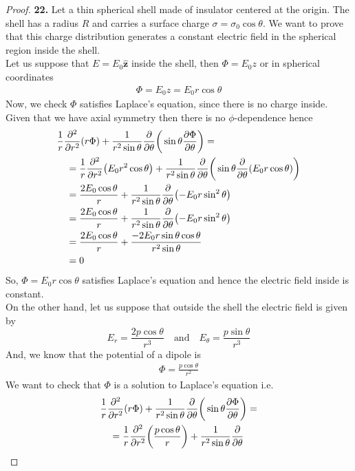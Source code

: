 \documentclass[11pt]{article}
\newcommand{\hatz}{\bm{\hat{z}}}
\theoremstyle{definition}
\begin{document}
\cleardoublepage
\begin{proof}{\textbf{22.}}
Let a thin spherical shell made of insulator centered at the origin. The shell
has a radius $R$ and carries a surface charge $\sigma = \sigma_0\cos\theta$.
We want to prove that this charge distribution generates a constant electric
field in the spherical region inside the shell.
\\
Let us suppose that $E = E_0 \hatz$ inside the shell, then $\Phi = E_0 z$
or in spherical coordinates
\begin{align*}
    \Phi = E_0 z = E_0 r\cos\theta
\end{align*}
Now, we check $\Phi$ satisfies Laplace's equation, since there is no charge
inside. Given that we have axial symmetry then there is no
$\phi$-dependence hence
\begin{align*}
    &\frac{1}{r}\pdv[2]{r}(r\Phi)
    + \frac{1}{r^2\sin\theta}\pdv{\theta}\bigg(\sin\theta\pdv{\Phi}{\theta}\bigg) =\\
    &\quad= \frac{1}{r}\pdv[2]{r}(E_0 r^2\cos\theta)
    + \frac{1}{r^2\sin\theta}\pdv{\theta}\bigg(\sin\theta\pdv{\theta}(E_0 r\cos\theta)
    \bigg)\\
    &\quad= \frac{2E_0\cos\theta}{r}
    + \frac{1}{r^2\sin\theta}\pdv{\theta}(-E_0 r\sin^2\theta)\\
    &\quad= \frac{2E_0\cos\theta}{r}
    + \frac{1}{r^2\sin\theta}\pdv{\theta}(-E_0 r\sin^2\theta)\\
    &\quad= \frac{2E_0\cos\theta}{r}
    + \frac{-2E_0 r\sin\theta\cos\theta}{r^2\sin\theta}\\
    &\quad= 0
\end{align*}
So, $\Phi = E_0 r \cos\theta$ satisfies Laplace's equation and hence the electric
field inside is constant.
\\
On the other hand, let us suppose that outside the shell the electric field is
given by
$$E_r = \frac{2p\cos\theta}{r^3}\quad\text{and}\quad E_\theta =\frac{p\sin\theta}{r^3}$$
And, we know that the potential of a dipole is 
\begin{align*}
    \Phi = \frac{p\cos\theta}{r^2}
\end{align*}
We want to check that $\Phi$ is a solution to Laplace's equation i.e.
\begin{align*}
    &\frac{1}{r}\pdv[2]{r}(r\Phi)
    + \frac{1}{r^2\sin\theta}\pdv{\theta}\bigg(\sin\theta\pdv{\Phi}{\theta}\bigg) =\\
    &\quad= \frac{1}{r}\pdv[2]{r}(\frac{p\cos\theta}{r})
    + \frac{1}{r^2\sin\theta}\pdv{\theta}

\end{align*}
\end{proof}
\end{document}
